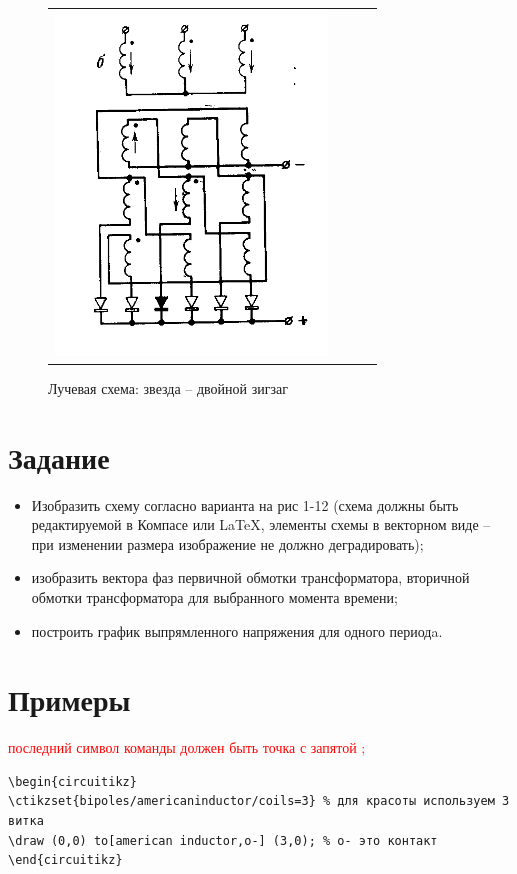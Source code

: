 \begin{figure}[!ht]
\begin{tabular}{cccc}
\begin{minipage}{0.22\textwidth}
        \includegraphics[scale=0.3]{schema12}
	\caption{\small Лучевая схема: звезда -- двойной зигзаг}
\end{minipage}
       \\
\end{tabular}
\end{figure}


\section*{Задание}
\begin{itemize}
	\item Изобразить схему согласно варианта на рис 1-12 (схема должны быть редактируемой в Компасе или \LaTeX \cite{circuitikz}, элементы схемы в векторном виде -- при изменении размера изображение не должно деградировать);
	\item изобразить вектора фаз первичной обмотки трансформатора, вторичной обмотки трансформатора для выбранного момента времени;
	\item построить график выпрямленного напряжения для одного периодa.

\end{itemize}



\section*{Примеры}

\textcolor{red}{последний символ команды должен быть точка с запятой ;}



\begin{verbatim}
\begin{circuitikz}
\ctikzset{bipoles/americaninductor/coils=3} % для красоты используем 3 витка
\draw (0,0) to[american inductor,o-] (3,0); % o- это контакт
\end{circuitikz}
\end{verbatim}

